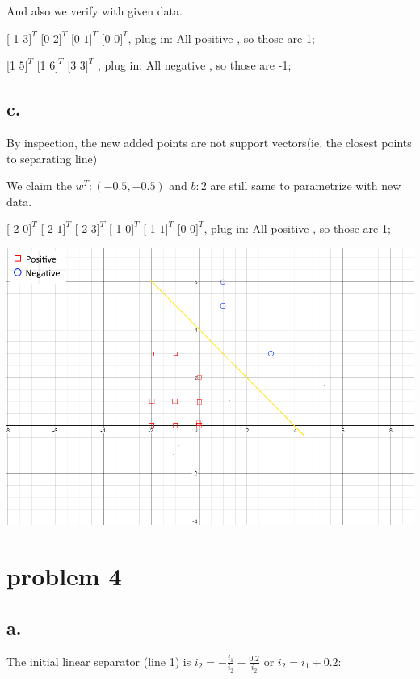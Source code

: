\documentclass[12pt, letterpaper]{article}
\begin{document}
	And also we verify with given data.
	
	[-1 $3]^{T}$ [0 $2]^{T}$ [0 $1]^{T}$ [0 $0]^{T}$, plug in:
	All positive , so those are 1;
	
	[1 $5]^{T}$ [1 $6]^{T}$ [3 $3]^{T}$ , plug in:
	All negative , so those are -1;
	
	
	
	\subsection{c.}
	By inspection, the new added points are not support vectors(ie. the closest points to separating line)
	
	We claim the $w^{T}:(-0.5,-0.5)$ and $b:2$ are still same to parametrize with new data. 
	
	[-2 $0]^{T}$ [-2 $1]^{T}$ [-2 $3]^{T}$ [-1 $0]^{T}$ [-1 $1]^{T}$ [0 $0]^{T}$, plug in:
	All positive , so those are 1;
	
	\includegraphics[scale=0.6]{"problem-3-c"}
	
	\section{problem 4}
	\subsection{a.}
	The initial linear separator (line 1) is $i_2 = -\frac{i_1}{i_2} - \frac{0.2}{i_2}$ or $i_2 = i_1 + 0.2$:
	\medskip
	
\end{document}
